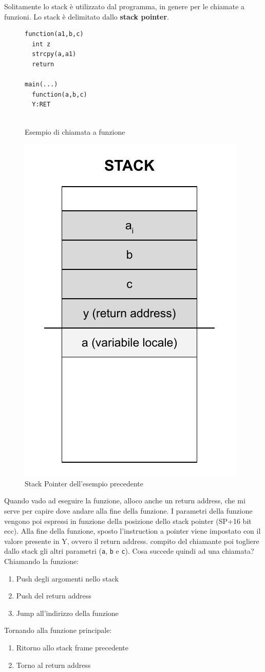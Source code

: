 \documentclass[a4paper,12pt]{article}
\begin{document}
Solitamente lo stack è utilizzato dal programma, in genere per le chiamate a funzioni. Lo stack è delimitato dallo \textbf{stack pointer}.

\begin{figure}[H]
\centering
\begin{lstlisting}[xleftmargin=.35\textwidth]
function(a1,b,c)
  int z
  strcpy(a,a1)
  return
  
main(...)
  function(a,b,c)
  Y:RET	
	
\end{lstlisting}
\caption{Esempio di chiamata a funzione}
\end{figure}

\begin{figure}[H]
	\centering
	\includegraphics[width=0.4\linewidth]{Immagini/Stack3.pdf}
	\caption{Stack Pointer dell'esempio precedente}
\end{figure}

Quando vado ad eseguire la funzione, alloco anche un return address, che mi serve per capire dove andare alla fine della funzione. I parametri della funzione vengono poi espressi in funzione della posizione dello stack pointer (SP+16 bit ecc). Alla fine della funzione, sposto l'instruction a pointer viene impostato con il valore presente in Y, ovvero il return address. \E compito del chiamante poi togliere dallo stack gli altri parametri (\texttt{a}, \texttt{b} e \texttt{c}).
Cosa succede quindi ad una chiamata?\\
Chiamando la funzione:
\begin{enumerate}
\item Push degli argomenti nello stack
\item Push del return address
\item Jump all'indirizzo della funzione
\end{enumerate}
Tornando alla funzione principale:
\begin{enumerate}
\item Ritorno allo stack frame precedente
\item Torno al return address
\end{enumerate}
\end{document}
